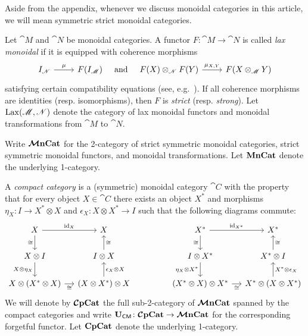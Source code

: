 \documentclass[11pt,oneside,article]{memoir}
\begin{document}
\begin{warning}
    \label{warn:symmetric}
  Aside from the appendix, whenever we discuss monoidal categories in this article, we will mean
  symmetric strict monoidal categories.
\end{warning}

Let $\cat{M}$ and $\cat{N}$ be monoidal categories. A functor $F\colon\cat{M}\to\cat{N}$ is called
\emph{lax monoidal} if it is equipped with coherence morphisms
\begin{equation*}
  \begin{tikzcd}
    I_{\cat{N}} \rar{\mu} & F(I_{\cat{M}})
  \end{tikzcd}
  \quad\text{and}\quad
  \begin{tikzcd}
    F(X) \otimes_{\cat{N}} F(Y) \rar{\mu_{X,Y}} & F(X\otimes_{\cat{M}} Y)
  \end{tikzcd}
\end{equation*}
satisfying certain compatibility equations (see, e.g.\ \cite{Leinster,BorceuxV2}). If all coherence
morphisms are identities (resp. isomorphisms), then $F$ is \emph{strict} (resp. \emph{strong}). Let
$\operatorname{Lax}(\mathscr{M},\mathscr{N})$ denote the category of lax monoidal functors and monoidal transformations
from $\cat{M}$ to $\cat{N}$.

Write $\bm{\mathcal{M}}\mathbf{nCat}$ for the 2-category of strict symmetric monoidal categories, strict symmetric
monoidal functors, and monoidal transformations. Let $\mathbf{MnCat}$ denote the underlying 1-category.

A \emph{compact category} is a (symmetric) monoidal category $\cat{C}$ with the property that for
every object $X\in\cat{C}$ there exists an object $X^*$ and morphisms $\eta_X\colon I\to X^*\otimes
X$ and $\epsilon_X\colon X\otimes X^*\to I$ such that the following diagrams commute:
\begin{equation*}
  \begin{tikzcd}[column sep=small]
    X\arrow[r,"\id_X"]\arrow[d,"\cong"'] & X \\
    X\otimes I\arrow[d,"X\otimes\eta_X"'] & I\otimes X\arrow[u,"\cong"'] \\
    X\otimes(X^*\otimes X)\arrow[r,"\cong"'] & (X\otimes X^*)\otimes X\arrow[u,"\epsilon_X\otimes X"']
  \end{tikzcd}
  \hspace{.6in}
  \begin{tikzcd}[column sep=small]
    X^*\arrow[r,"\id_{X^*}"]\arrow[d,"\cong"'] & X^*\\
    I\otimes X^*\arrow[d,"\eta_X\otimes X^*"'] & X^*\otimes I\arrow[u,"\cong"'] \\
    (X^*\otimes X)\otimes X^*\arrow[r,"\cong"'] & X^*\otimes (X\otimes X^*)\arrow[u,"X^*\otimes\epsilon_X"']
  \end{tikzcd}
\end{equation*}
We will denote by $\bm{\mathcal{C}}\mathbf{pCat}$ the full sub-2-category of $\bm{\mathcal{M}}\mathbf{nCat}$ spanned by the compact
categories and write $\mathbf{U}_{\mathsf{CM}}\colon\bm{\mathcal{C}}\mathbf{pCat}\to\bm{\mathcal{M}}\mathbf{nCat}$ for the corresponding forgetful functor. Let
$\mathbf{CpCat}$ denote the underlying 1-category.
\end{document}
